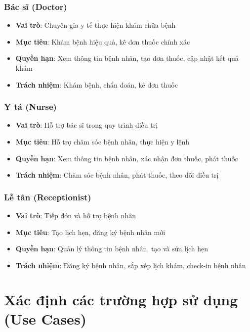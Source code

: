 \documentclass[12pt,a4paper]{report}
\begin{document}
\subsubsection{Bác sĩ (Doctor)}
\begin{itemize}
    \item \textbf{Vai trò}: Chuyên gia y tế thực hiện khám chữa bệnh
    \item \textbf{Mục tiêu}: Khám bệnh hiệu quả, kê đơn thuốc chính xác
    \item \textbf{Quyền hạn}: Xem thông tin bệnh nhân, tạo đơn thuốc, cập nhật kết quả khám
    \item \textbf{Trách nhiệm}: Khám bệnh, chẩn đoán, kê đơn thuốc
\end{itemize}

\subsubsection{Y tá (Nurse)}
\begin{itemize}
    \item \textbf{Vai trò}: Hỗ trợ bác sĩ trong quy trình điều trị
    \item \textbf{Mục tiêu}: Hỗ trợ chăm sóc bệnh nhân, thực hiện y lệnh
    \item \textbf{Quyền hạn}: Xem thông tin bệnh nhân, xác nhận đơn thuốc, phát thuốc
    \item \textbf{Trách nhiệm}: Chăm sóc bệnh nhân, phát thuốc, theo dõi điều trị
\end{itemize}

\subsubsection{Lễ tân (Receptionist)}
\begin{itemize}
    \item \textbf{Vai trò}: Tiếp đón và hỗ trợ bệnh nhân
    \item \textbf{Mục tiêu}: Tạo lịch hẹn, đăng ký bệnh nhân mới
    \item \textbf{Quyền hạn}: Quản lý thông tin bệnh nhân, tạo và sửa lịch hẹn
    \item \textbf{Trách nhiệm}: Đăng ký bệnh nhân, sắp xếp lịch khám, check-in bệnh nhân
\end{itemize}

\section{Xác định các trường hợp sử dụng (Use Cases)}
\end{document}
